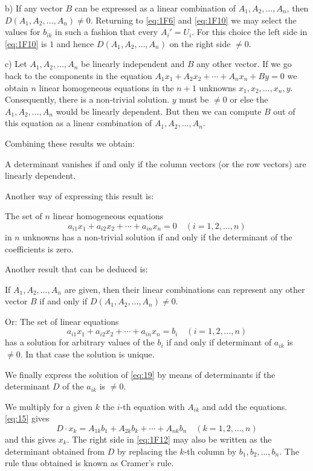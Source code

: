 \documentclass[10pt,leqno]{article}
\theoremstyle{definition}
\begin{document}
b) If any vector $B$ can be expressed as a linear combination of $A_1, A_2, \ldots, A_n$, then $D(A_1, A_2, \ldots, A_n) \not= 0$.
Returning to \eqref{eq:1F6} and \eqref{eq:1F10} we may select the values for $b_{ik}$ in such a fashion that every $A_i' = U_i$.
For this choice the left side in \eqref{eq:1F10} is $1$ and hence $D(A_1, A_2, \ldots, A_n)$ on the right side $\not= 0$.

c) Let $A_1, A_2, \ldots, A_n$ be linearly independent and $B$ any other vector.
If we go back to the components in the equation $A_1 x_1 + A_2 x_2 + \cdots + A_n x_n + By = 0$ we obtain $n$ linear homogeneous equations in the $n+1$ unknowns $x_1,x_2,\ldots,x_n,y$.
Consequently, there is a non-trivial solution.
$y$ must be $\not= 0$ or else the $A_1,A_2,\ldots,A_n$ would be linearly dependent.
But then we can compute $B$ out of this equation as a linear combination of $A_1,A_2, \ldots, A_n$.

Combining these results we obtain:

A determinant vanishes if and only if the column vectors (or the row vectors) are linearly dependent.

Another way of expressing this result is:

The set of $n$ linear homogeneous equations
\[
a_{i1} x_1 + a_{i2} x_2 + \cdots + a_{in} x_n = 0
\quad
(i = 1,2,\ldots,n)
\]
in $n$ unknowns has a non-trivial solution if and only if the determinant of the coefficients is zero.

Another result that can be deduced is:

If $A_1, A_2, \ldots, A_n$ are given, then their linear combinations can represent any other vector $B$ if and only if $D(A_1,A_2, \ldots, A_n) \not= 0$.

Or:
The set of linear equations
\begin{equation}
\label{eq:19}
a_{i1} x_1 + a_{i2} x_2 + \cdots + a_{in} x_n = b_i
\quad
(i = 1,2,\ldots,n)
\end{equation}
has a solution for arbitrary values of the $b_i$ if and only if determinant of $a_{ik}$ is $\not= 0$.
In that case the solution is unique.

We finally express the solution of \eqref{eq:19} by means of determinants if the determinant $D$ of the $a_{ik}$ is $\not= 0$.

We multiply for a given $k$ the $i$-th equation with $A_{ik}$ and add the equations.
\eqref{eq:15} gives
\begin{equation}
\label{eq:20}
D \cdot x_k = A_{1k} b_1 + A_{2k} b_k + \cdots + A_{nk} b_n
\quad
(k = 1,2,\ldots,n)
\end{equation}
and this gives $x_k$.
The right side in \eqref{eq:1F12} may also be written as the determinant obtained from $D$ by replacing the $k$-th column by $b_1,b_2,\ldots,b_n$.
The rule thus obtained is known as Cramer's rule.
\end{document}
